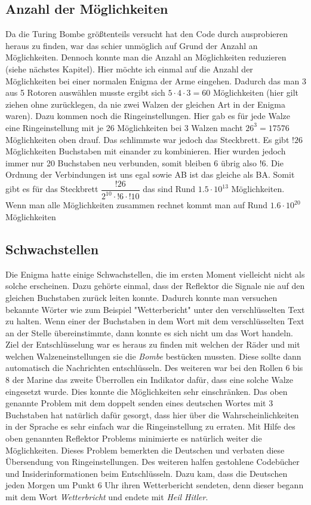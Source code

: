 \subsection{Anzahl der Möglichkeiten}
Da die Turing Bombe größtenteils versucht hat den Code durch ausprobieren heraus zu finden, war das schier unmöglich auf Grund der Anzahl an Möglichkeiten. Dennoch konnte man die Anzahl an Möglichkeiten reduzieren (siehe nächstes Kapitel). Hier möchte ich einmal auf die Anzahl der Möglichkeiten bei einer normalen Enigma der Arme eingehen. Dadurch das man 3 aus 5 Rotoren auswählen musste ergibt sich $5 \cdot 4 \cdot 3 = 60$ Möglichkeiten (hier gilt ziehen ohne zurücklegen, da nie zwei Walzen der gleichen Art in der Enigma waren). Dazu kommen noch die Ringeinstellungen. Hier gab es für jede Walze eine Ringeinstellung mit je 26 Möglichkeiten bei 3 Walzen macht $26^3 = 17576$ Möglichkeiten oben drauf. Das schlimmste war jedoch das Steckbrett. Es gibt $!26$ Möglichkeiten Buchstaben mit einander zu kombinieren. Hier wurden jedoch immer nur 20 Buchstaben neu verbunden, somit bleiben 6 übrig also $!6$. Die Ordnung der Verbindungen ist uns egal sowie AB ist das gleiche als BA. Somit gibt es für das Steckbrett $\dfrac{!26}{2^{10}\cdot!6\cdot!10}$ das sind Rund $1.5 \cdot 10^{13}$ Möglichkeiten. Wenn man alle Möglichkeiten zusammen rechnet kommt man auf Rund $1.6 \cdot 10^{20}$  Möglichkeiten\cite{emach}

\subsection{Schwachstellen}
Die Enigma hatte einige Schwachstellen, die im ersten Moment vielleicht nicht als solche erscheinen. Dazu gehörte einmal, dass der Reflektor die Signale nie auf den gleichen Buchstaben zurück leiten konnte. Dadurch konnte man versuchen bekannte Wörter wie zum Beispiel "Wetterbericht" unter den verschlüsselten Text zu halten. Wenn einer der Buchstaben in dem Wort mit dem verschlüsselten Text an der Stelle übereinstimmte, dann konnte es sich nicht um das Wort handeln. Ziel der Entschlüsselung war es heraus zu finden mit welchen der Räder und mit welchen Walzeneinstellungen sie die \emph{Bombe} bestücken mussten. Diese sollte dann automatisch die Nachrichten entschlüsseln. Des weiteren war bei den Rollen 6 bis 8 der Marine das zweite Überrollen ein Indikator dafür, dass eine solche Walze eingesetzt wurde. Dies konnte die Möglichkeiten sehr einschränken. Das oben genannte Problem mit dem doppelt senden eines deutschen Wortes mit 3 Buchstaben hat natürlich dafür gesorgt, dass hier über die Wahrscheinlichkeiten in der Sprache es sehr einfach war die Ringeinstellung zu erraten. Mit Hilfe des oben genannten Reflektor Problems minimierte es natürlich weiter die Möglichkeiten. Dieses Problem bemerkten die Deutschen und verbaten diese Übersendung von Ringeinstellungen. Des weiteren halfen gestohlene Codebücher und Insiderinformationen beim Entschlüsseln. Dazu kam, dass die Deutschen jeden Morgen  um Punkt 6 Uhr ihren Wetterbericht sendeten, denn dieser begann mit dem Wort \emph{Wetterbricht} und endete mit \emph{Heil Hitler}. \cite{enigmaflaw} \cite{enigmaproblem1}